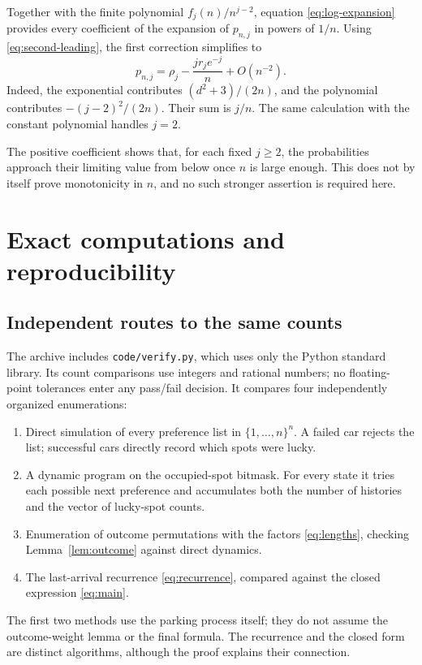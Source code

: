 \documentclass[11pt,letterpaper]{article}
\numberwithin{equation}{section}
\theoremstyle{definition}
\begin{document}
Together with the finite polynomial $f_j(n)/n^{j-2}$, equation
\eqref{eq:log-expansion} provides every coefficient of the expansion of
$p_{n,j}$ in powers of $1/n$. Using \eqref{eq:second-leading}, the first
correction simplifies to
\begin{equation}\label{eq:first-correction}
 p_{n,j}=\rho_j-\frac{j r_j e^{-j}}{n}+O(n^{-2}).
\end{equation}
Indeed, the exponential contributes $(d^2+3)/(2n)$, and the polynomial
contributes $-(j-2)^2/(2n)$. Their sum is $j/n$. The same calculation with
the constant polynomial handles $j=2$.

The positive coefficient shows that, for each fixed $j\ge2$, the
probabilities approach their limiting value from below once $n$ is large
enough. This does not by itself prove monotonicity in $n$, and no such
stronger assertion is required here.

\section{Exact computations and reproducibility}
\label{sec:verification}

\subsection{Independent routes to the same counts}
The archive includes \texttt{code/verify.py}, which uses only the Python
standard library. Its count comparisons use integers and rational numbers;
no floating-point tolerances enter any pass/fail decision. It compares
four independently organized enumerations:

\begin{enumerate}[leftmargin=1.5em,itemsep=.3em]
\item Direct simulation of every preference list in $\{1,\ldots,n\}^n$.
A failed car rejects the list; successful cars directly record which spots
were lucky.
\item A dynamic program on the occupied-spot bitmask. For every state it
tries each possible next preference and accumulates both the number of
histories and the vector of lucky-spot counts.
\item Enumeration of outcome permutations with the factors
\eqref{eq:lengths}, checking Lemma~\ref{lem:outcome} against direct dynamics.
\item The last-arrival recurrence \eqref{eq:recurrence}, compared against the
closed expression \eqref{eq:main}.
\end{enumerate}
The first two methods use the parking process itself; they do not assume
the outcome-weight lemma or the final formula. The recurrence and the
closed form are distinct algorithms, although the proof explains their
connection.
\end{document}
